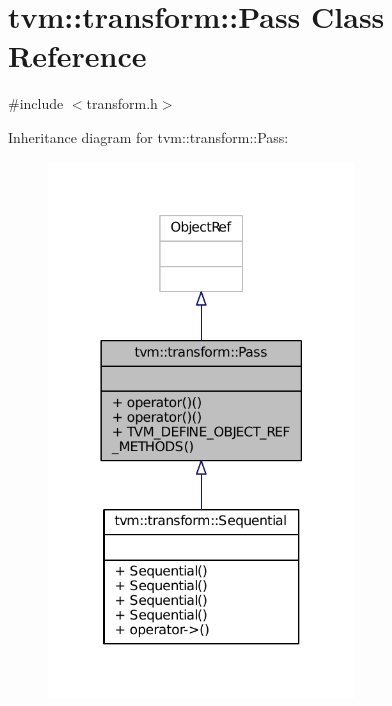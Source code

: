 \hypertarget{classtvm_1_1transform_1_1Pass}{}\section{tvm\+:\+:transform\+:\+:Pass Class Reference}
\label{classtvm_1_1transform_1_1Pass}


{\ttfamily \#include $<$transform.\+h$>$}



Inheritance diagram for tvm\+:\+:transform\+:\+:Pass\+:
\nopagebreak
\begin{figure}[H]
\begin{center}
\leavevmode
\includegraphics[width=230pt]{classtvm_1_1transform_1_1Pass__inherit__graph}
\end{center}
\end{figure}


